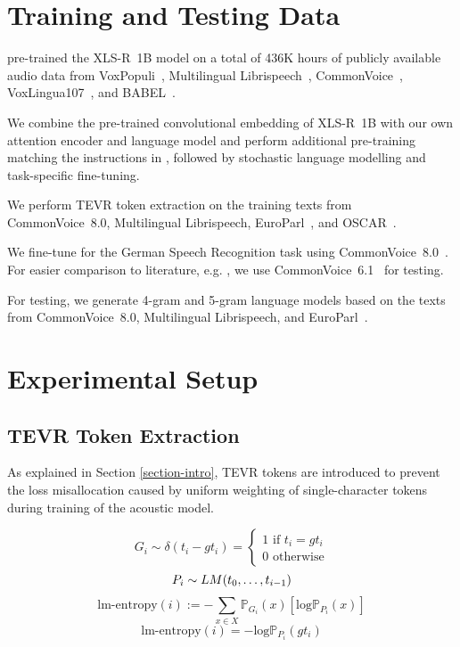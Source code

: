 \section{Training and Testing Data}

\citet{xlsr_1B_2021} pre-trained the XLS-R~1B model on a total of 436K hours of publicly available audio data from VoxPopuli~\citep{voxpopuli}, Multilingual Librispeech~\citep{mls}, CommonVoice~\citep{commonvoice}, VoxLingua107~\citep{voxlingua107}, and BABEL~\citep{babel}.

We combine the pre-trained convolutional embedding of XLS-R~1B with our own attention encoder and language model and perform additional pre-training matching the instructions in \citet{xlsr_1B_2021}, followed by stochastic language modelling and task-specific fine-tuning.

We perform TEVR token extraction on the training texts from CommonVoice~8.0, Multilingual Librispeech, EuroParl~\citep{eparl}, and OSCAR~\citep{oscar1,oscar2}.

We fine-tune for the German Speech Recognition task using CommonVoice~8.0~\citep{commonvoice}. For easier comparison to literature, e.g. \citet{scribosermo}, we use CommonVoice~6.1~\citep{commonvoice} for testing.

For testing, we generate 4-gram and 5-gram language models based on the texts from CommonVoice~8.0, Multilingual Librispeech, and EuroParl~\citep{eparl}. 

\section{Experimental Setup}

\subsection{TEVR Token Extraction}
\label{section-tevr}

As explained in Section \ref{section-intro}, TEVR tokens are introduced to prevent the loss misallocation caused by uniform weighting of single-character tokens during training of the acoustic model. 

\begin{equation}
\label{eq-g}
G_i \sim \delta(t_i-gt_i) = \left\lbrace
\begin{array}{l} 
1 \text{ if } t_i = gt_i \\ 
0 \text{ otherwise} 
\end{array}
\right.
\end{equation}
\begin{equation}
\label{eq-p}
P_i \sim LM(t_0, \mathellipsis, t_{i-1}) 
\end{equation}
\begin{equation}
\label{eq-ce}
\text{lm-entropy}(i) := - \displaystyle\sum_{x \in X} ^{}  \mathbb{P}_{G_i}(x)[\text{log} \mathbb{P}_{P_i}(x)]
\end{equation}
\begin{equation}
\label{eq-ce2}
\text{lm-entropy}(i) = - \text{log} \mathbb{P}_{P_i}(gt_i)
\end{equation}

